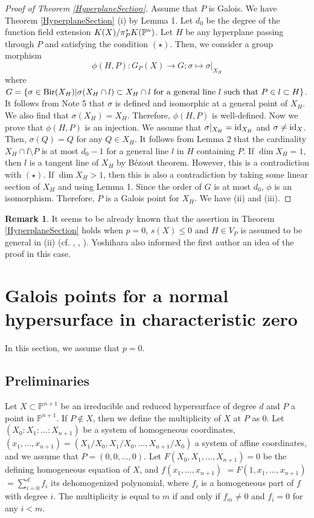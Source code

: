 \documentclass[10pt,oneside]{amsart}
\theoremstyle{definition}
\newtheorem{remark}{Remark}
\begin{document}
\begin{proof}[Proof of Theorem \ref{HyperplaneSection}] 
Assume that $P$ is Galois. 
We have Theorem \ref{HyperplaneSection} (i) by Lemma 1. 
Let $d_0$ be the degree of the function field extension $K(X)/\pi_P^*K(\Bbb P^n)$. 
Let $H$ be any hyperplane passing through $P$ and satisfying the condition $(\star)$. 
Then, we consider a group morphism
$$\phi(H, P): G_P(X) \rightarrow G; \sigma \mapsto \sigma|_{X_H} $$
where $G=\{ \sigma \in {\rm Bir}(X_H)|\sigma(X_H \cap l) \subset X_H \cap l \mbox{ for a general line } l \mbox{ such that } P \in l \subset H  \}$. 
It follows from Note 5 that $\sigma$ is defined and isomorphic at a general point of $X_H$. 
We also find that $\sigma(X_H)=X_H$. 
Therefore, $\phi(H, P)$ is well-defined.  
Now we prove that $\phi(H,P)$ is an injection. 
We assume that $\sigma|_{X_H}={\rm id}_{X_H}$ and $\sigma \ne {\rm id}_X$. 
Then, $\sigma(Q)=Q$ for any $Q \in X_H$. 
It follows from Lemma 2 that the cardinality $X_H \cap l\setminus{P}$ is at most $d_0-1$ for a general line $l$ in $H$ containing $P$. 
If $\dim X_H=1$, then $l$ is a tangent line of $X_H$ by B\'{e}zout theorem. 
However, this is a contradiction with $(\star)$.  
If $\dim X_H >1$, then this is also a contradiction by taking some linear section of $X_H$ and using Lemma 1. 
Since the order of $G$ is at most $d_0$, $\phi$ is an isomorphism. 
Therefore, $P$ is a Galois point for $X_H$. 
We have (ii) and (iii). 
\end{proof}

\begin{remark} 
It seems to be already known that the assertion in Theorem \ref{HyperplaneSection} holds when $p=0$, $s(X) \le 0$ and $H \in V_P$ is assumed to be general in (ii) (cf. \cite{takahashi}, \cite[Proposition 2.5]{yoshihara2}, \cite{yoshihara3}). 
Yoshihara \cite{yoshihara5} also informed the first author an idea of the proof in this case. 
\end{remark} 

\section{Galois points for a normal hypersurface in characteristic zero} 
In this section, we assume that $p=0$.

\subsection{Preliminaries}
Let $X \subset \mathbb{P}^{n+1}$ be an irreducible and reduced hypersurface of degree $d$ and $P$ a point in $\mathbb{P}^{n+1}$.
If $P \not\in X$, then we define the multiplicity of $X$ at $P$ as $0$.  
Let $(X_0: X_1: \dots: X_{n+1})$ be a system of homogeneous coordinates, $(x_1, \dots, x_{n+1})=(X_1/X_0, X_{1}/X_{0}, \dots, X_{n+1}/X_{0})$ a system of affine coordinates, and we assume that $P=(0,0,\dots, 0)$. Let $F(X_0, X_1, \dots, X_{n+1})=0$ be the defining homogeneous equation of $X$, and $f(x_1, \dots, x_{n+1})$ $=F(1, x_1, \dots, x_{n+1})$ $= \sum_{i=0}^{d}f_i$ its dehomogenized polynomial, where $f_i$ is a homogeneous part of $f$ with degree $i$. 
The multiplicity is equal to $m$ if and only if $f_m \ne 0$ and $f_i=0$ for any $i < m$. 
\end{document}
